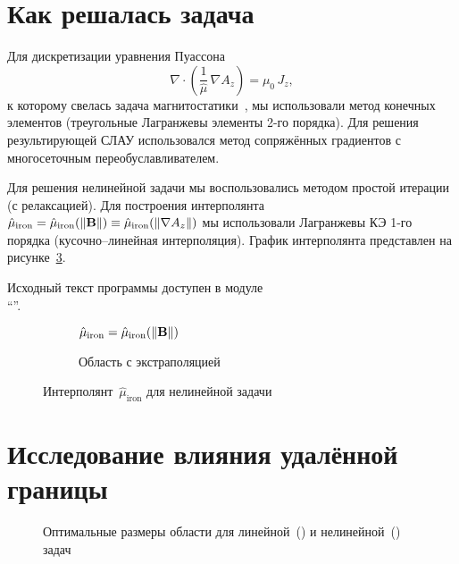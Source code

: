 \section{Как решалась задача}

Для дискретизации уравнения Пуассона
$$
	\nabla \cdot \left( \frac{1}{\hat{\mu}} \, \nabla A_z \right) = \mu_0 \, J_z,
$$
к которому свелась задача магнитостатики~\cite{mke}, мы использовали метод конечных элементов (треугольные Лагранжевы элементы 2-го порядка). Для решения результирующей СЛАУ использовался метод сопряжённых градиентов с многосеточным переобуславливателем.

Для решения нелинейной задачи мы воспользовались методом простой итерации (с релаксацией). Для построения интерполянта~${\hat{\mu}_{\text{iron}} = \hat{\mu}_{\text{iron}}(\norm{\boldsymbol{\mathbf{B}}}) \equiv \hat{\mu}_{\text{iron}}(\norm{\nabla A_z})}$ мы использовали Лагранжевы КЭ 1-го порядка (кусочно--линейная интерполяция). График интерполянта представлен на рисунке~\ref{fig:mu}.

Исходный текст программы доступен в модуле \catspdes{} \\
“”.

\begin{figure}[b!]
	\centering
	\begin{subfigure}{.45\linewidth}
		\centering
		\caption{${\hat{\mu}_{\text{iron}} = \hat{\mu}_{\text{iron}}(\norm{\boldsymbol{\mathbf{B}}})}$}
		\label{fig:mu:interp}
	\end{subfigure}%
	\hfill
	\begin{subfigure}{.45\linewidth}
		\centering
		\caption{Область с экстраполяцией}
		\label{fig:mu:extrap}
	\end{subfigure}
	\caption{
		Интерполянт~${\hat{\mu}_{\text{iron}}}$ для нелинейной задачи
	}
	\label{fig:mu}
\end{figure}

\section{Исследование влияния удалённой границы}

\begin{figure}[h!]
	\centering
	\begin{subfigure}{.45\linewidth}
		\centering
		\caption{}
		\label{fig:s:linear}
	\end{subfigure}%
	\hfill
	\begin{subfigure}{.45\linewidth}
		\centering
		\caption{}
		\label{fig:s:nonlinear}
	\end{subfigure}
	\caption[Оптимальные размеры области для линейной и нелинейной задач]{
		Оптимальные размеры области для линейной~() и нелинейной~() задач
	}
	\label{fig:s}
\end{figure}

